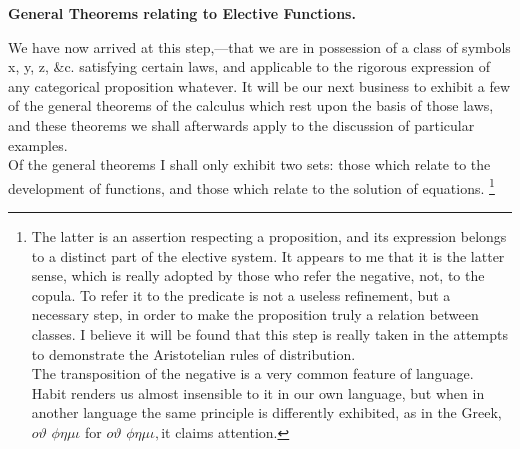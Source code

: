 \documentclass{article}
\begin{document}
{\large{\textbf{General Theorems relating to Elective Functions.\\}}
\normalsize{ We have now arrived at this step,—that we are in possession of a class of symbols
x, y, z, \&c. satisfying certain laws, and applicable to the rigorous expression of
any categorical proposition whatever. It will be our next business to exhibit a
few of the general theorems of the calculus which rest upon the basis of those
laws, and these theorems we shall afterwards apply to the discussion of particular
examples.\\
\hspace{.2in}Of the general theorems I shall only exhibit two sets: those which relate to
the development of functions, and those which relate to the solution of equations.
\footnote{\footnotesize{The latter is an assertion respecting a proposition, and its expression belongs to a distinct
part of the elective system. It appears to me that it is the latter sense, which is really adopted
by those who refer the negative, not, to the copula. To refer it to the predicate is not a useless
refinement, but a necessary step, in order to make the proposition truly a relation between
classes. I believe it will be found that this step is really taken in the attempts to demonstrate
the Aristotelian rules of distribution.\\
\hspace{.2in} 
The transposition of the negative is a very common feature of language. Habit renders us
almost insensible to it in our own language, but when in another language the same principle
is differently exhibited, as in the Greek,$o\vartheta$ $\phi\eta\mu\iota$ for $o\vartheta$ $\phi\eta\mu\iota,$it claims attention.}}

}}
\end{document}
